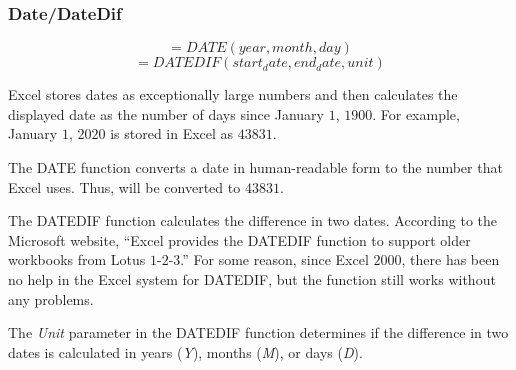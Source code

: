 \subsubsection{Date/DateDif}

\[ =DATE(year, month, day) \]
\[ =DATEDIF (start_date, end_date, unit) \]

Excel stores dates as exceptionally large numbers and then calculates the displayed date as the number of days since January $ 1 $, $ 1900 $. For example, January $ 1 $, $ 2020 $ is stored in Excel as $ 43831 $. 

The DATE function converts a date in human-readable form to the number that Excel uses. Thus,  will be converted to $ 43831 $.

The DATEDIF function calculates the difference in two dates. According to the Microsoft website, ``Excel provides the DATEDIF function to support older workbooks from Lotus $ 1 $-$ 2 $-$ 3 $.'' For some reason, since Excel $ 2000 $, there has been no help in the Excel system for DATEDIF, but the function still works without any problems. 

The \textit{Unit} parameter in the DATEDIF function determines if the difference in two dates is calculated in years (\textit{Y}), months (\textit{M}), or days (\textit{D}).

